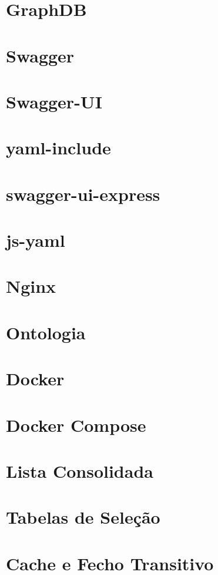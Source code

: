 
\section{GraphDB}

\section{Swagger}

\section{Swagger-UI}

\section{yaml-include}

\section{swagger-ui-express}

\section{js-yaml}

\section{Nginx}
\cite{nginxcook}

\section{Ontologia}
\cite{bontology}

\section{Docker}
\cite{udocker}

\section{Docker Compose}
\cite{udocker}

\section{Lista Consolidada}

\section{Tabelas de Seleção}

\section{Cache e Fecho Transitivo}
